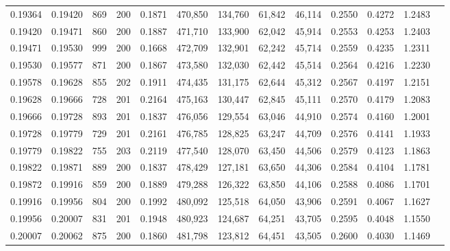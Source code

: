 \begin{tabular}{rrrrrrrrrrrrr}
0.19364 & 0.19420 &   869 & 200 &                                     0.1871 & 470,850 & 134,760 &  61,842 &  46,114 & 0.2550 & 0.4272 & 1.2483 \\
0.19420 & 0.19471 &   860 & 200 &                                     0.1887 & 471,710 & 133,900 &  62,042 &  45,914 & 0.2553 & 0.4253 & 1.2403 \\
0.19471 & 0.19530 &   999 & 200 &                                     0.1668 & 472,709 & 132,901 &  62,242 &  45,714 & 0.2559 & 0.4235 & 1.2311 \\
0.19530 & 0.19577 &   871 & 200 &                                     0.1867 & 473,580 & 132,030 &  62,442 &  45,514 & 0.2564 & 0.4216 & 1.2230 \\
0.19578 & 0.19628 &   855 & 202 &                                     0.1911 & 474,435 & 131,175 &  62,644 &  45,312 & 0.2567 & 0.4197 & 1.2151 \\
0.19628 & 0.19666 &   728 & 201 &                                     0.2164 & 475,163 & 130,447 &  62,845 &  45,111 & 0.2570 & 0.4179 & 1.2083 \\
0.19666 & 0.19728 &   893 & 201 &                                     0.1837 & 476,056 & 129,554 &  63,046 &  44,910 & 0.2574 & 0.4160 & 1.2001 \\
0.19728 & 0.19779 &   729 & 201 &                                     0.2161 & 476,785 & 128,825 &  63,247 &  44,709 & 0.2576 & 0.4141 & 1.1933 \\
0.19779 & 0.19822 &   755 & 203 &                                     0.2119 & 477,540 & 128,070 &  63,450 &  44,506 & 0.2579 & 0.4123 & 1.1863 \\
0.19822 & 0.19871 &   889 & 200 &                                     0.1837 & 478,429 & 127,181 &  63,650 &  44,306 & 0.2584 & 0.4104 & 1.1781 \\
0.19872 & 0.19916 &   859 & 200 &                                     0.1889 & 479,288 & 126,322 &  63,850 &  44,106 & 0.2588 & 0.4086 & 1.1701 \\
0.19916 & 0.19956 &   804 & 200 &                                     0.1992 & 480,092 & 125,518 &  64,050 &  43,906 & 0.2591 & 0.4067 & 1.1627 \\
0.19956 & 0.20007 &   831 & 201 &                                     0.1948 & 480,923 & 124,687 &  64,251 &  43,705 & 0.2595 & 0.4048 & 1.1550 \\
0.20007 & 0.20062 &   875 & 200 &                                     0.1860 & 481,798 & 123,812 &  64,451 &  43,505 & 0.2600 & 0.4030 & 1.1469 \\

\end{tabular}
